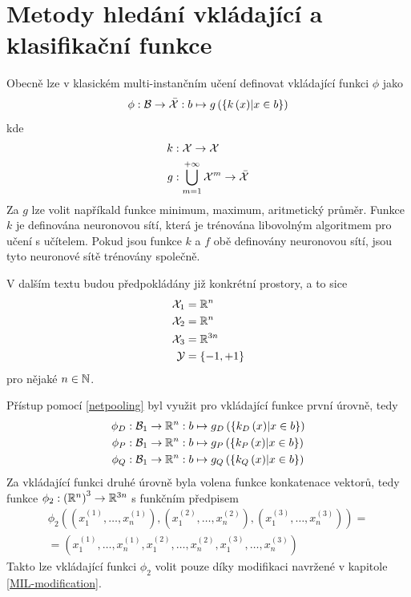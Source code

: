 \section{Metody hledání vkládající a klasifikační funkce}
Obecně lze v klasickém multi-instančním učení definovat vkládající funkci \( \phi \) jako
\begin{equation}\label{netpooling}
	\phi : \mathcal B \to \bar{\mathcal X} : b \mapsto g \left( \left\{ k \left( x \right) \middle| x \in b \right\} \right)
\end{equation}
kde 
\begin{align*}
	k &: \mathcal X \to \mathcal X \\
	g &: \bigcup_{m = 1}^{+ \infty} \mathcal X^m \to \bar{\mathcal X}
\end{align*}
Za \( g \) lze volit napříkald funkce minimum, maximum, aritmetický průměr. Funkce \( k \) je definována neuronovou sítí, která je trénována libovolným algoritmem pro učení s učítelem. Pokud jsou funkce \( k \) a \( f \) obě definovány neuronovou sítí, jsou tyto neuronové sítě trénovány společně.

V dalším textu budou předpokládány již konkrétní prostory, a to sice
\begin{align*}
	\mathcal X_1 &= \mathbb R^n \\
	\mathcal X_2 &= \mathbb R^n \\
	\mathcal X_3 &= \mathbb R^{3n} \\
	\mathcal Y &= \left\{ -1, +1 \right\}
\end{align*}
pro nějaké \( n \in \mathbb N \).

Přístup pomocí \eqref{netpooling} byl využit pro vkládající funkce první úrovně, tedy
\begin{align*}
	\phi_D &: \mathcal B_1 \to \mathbb R^n : b \mapsto g_D \left( \left\{ k_D \left( x \right) \middle| x \in b \right\} \right) \\
	\phi_P &: \mathcal B_1 \to \mathbb R^n : b \mapsto g_P \left( \left\{ k_P \left( x \right) \middle| x \in b \right\} \right) \\
	\phi_Q &: \mathcal B_1 \to \mathbb R^n : b \mapsto g_Q \left( \left\{ k_Q \left( x \right) \middle| x \in b \right\} \right)
\end{align*}
Za vkládající funkci druhé úrovně byla volena funkce konkatenace vektorů, tedy funkce \( \phi_2 : \left( \mathbb R^n \right)^3  \to \mathbb R^{3n} \) s funkčním předpisem
\begin{multline}
	\phi_2 \left( \left( x_1^{(1)}, \dots, x_n^{(1)} \right), \left( x_1^{(2)}, \dots, x_n^{(2)} \right), \left( x_1^{(3)}, \dots, x_n^{(3)} \right) \right) = \\
	= \left( x_1^{(1)}, \dots, x_n^{(1)}, x_1^{(2)}, \dots, x_n^{(2)}, x_1^{(3)}, \dots, x_n^{(3)} \right)
\end{multline}
Takto lze vkládající funkci \( \phi_2 \) volit pouze díky modifikaci navržené v kapitole \ref{MIL-modification}.

